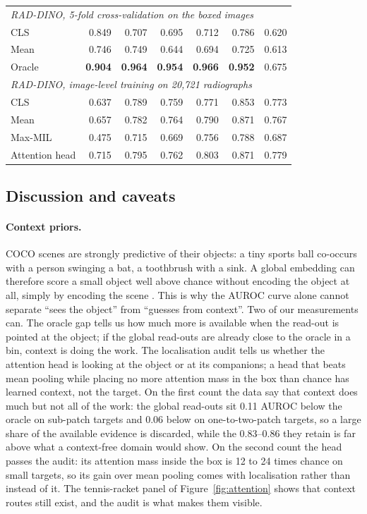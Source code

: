 \documentclass[10pt,letterpaper,twocolumn]{article}
\begin{document}
\begin{table}[t]
\begin{tabular}{lrrrrrr}
\midrule
\multicolumn{7}{l}{\emph{RAD-DINO, 5-fold cross-validation on the boxed images}} \\
CLS    & 0.849 & 0.707 & 0.695 & 0.712 & 0.786 & 0.620 \\
Mean   & 0.746 & 0.749 & 0.644 & 0.694 & 0.725 & 0.613 \\
Oracle & \textbf{0.904} & \textbf{0.964} & \textbf{0.954} & \textbf{0.966} & \textbf{0.952} & 0.675 \\
\multicolumn{7}{l}{\emph{RAD-DINO, image-level training on 20,721 radiographs}} \\
CLS            & 0.637 & 0.789 & 0.759 & 0.771 & 0.853 & 0.773 \\
Mean           & 0.657 & 0.782 & 0.764 & 0.790 & 0.871 & 0.767 \\
Max-MIL        & 0.475 & 0.715 & 0.669 & 0.756 & 0.788 & 0.687 \\
Attention head & 0.715 & 0.795 & 0.762 & 0.803 & 0.871 & 0.779 \\
\bottomrule
\end{tabular}
\end{table}

\subsection{Discussion and caveats}
\label{sec:discussion}
\paragraph{Context priors.}
COCO scenes are strongly predictive of their objects: a tiny sports ball co-occurs with a
person swinging a bat, a toothbrush with a sink. A global embedding can therefore score a small
object well above chance without encoding the object at all, simply by encoding the scene
\citep{oliva2007context}. This is why the AUROC curve alone cannot separate ``sees the object''
from ``guesses from context''. Two of our measurements can. The oracle gap tells us how much
more is available when the read-out is pointed at the object; if the global read-outs are
already close to the oracle in a bin, context is doing the work. The localisation audit tells
us whether the attention head is looking at the object or at its companions; a head that beats
mean pooling while placing no more attention mass in the box than chance has learned context,
not the target. On the first count the data say that context does much but not all of the
work: the global read-outs sit 0.11 AUROC below the oracle on sub-patch targets and 0.06 below
on one-to-two-patch targets, so a large share of the available evidence is discarded, while the
0.83--0.86 they retain is far above what a context-free domain would show. On the second count
the head passes the audit: its attention mass inside the box is 12 to 24 times chance on small
targets, so its gain over mean pooling comes with localisation rather than instead of it. The
tennis-racket panel of Figure~\ref{fig:attention} shows that context routes still exist, and
the audit is what makes them visible.
\end{document}
